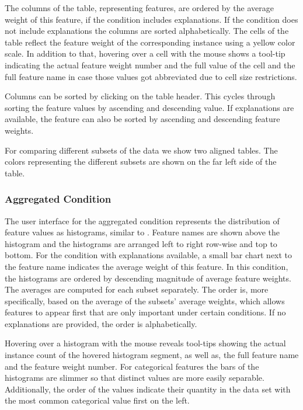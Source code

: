 The columns of the table, representing features, are ordered by the average weight of this feature, if the condition includes explanations.
If the condition does not include explanations the columns are sorted alphabetically.
The cells of the table reflect the feature weight of the corresponding instance using a yellow color scale.
In addition to that, hovering over a cell with the mouse shows a tool-tip indicating the actual feature weight number and the full value of the cell and the full feature name in case those values got abbreviated due to cell size restrictions.

Columns can be sorted by clicking on the table header.
This cycles through sorting the feature values by ascending and descending value.
If explanations are available, the feature can also be sorted by ascending and descending feature weights.

For comparing different subsets of the data we show two aligned tables.
The colors representing the different subsets are shown on the far left side of the table.

\subsubsection{Aggregated Condition}
The user interface for the aggregated condition represents the distribution of feature values as histograms, similar to \cite{seekaview}.
Feature names are shown above the histogram and the histograms are arranged left to right row-wise and top to bottom.
For the condition with explanations available, a small bar chart next to the feature name indicates the average weight of this feature.
In this condition, the histograms are ordered by descending magnitude of average feature weights.
The averages are computed for each subset separately.
The order is, more specifically, based on the average of the subsets' average weights, which allows features to appear first that are only important under certain conditions.
If no explanations are provided, the order is alphabetically.

Hovering over a histogram with the mouse reveals tool-tips showing the actual instance count of the hovered histogram segment, as well as, the full feature name and the feature weight number.
For categorical features the bars of the histograms are slimmer so that distinct values are more easily separable.
Additionally, the order of the values indicate their quantity in the data set with the most common categorical value first on the left.

